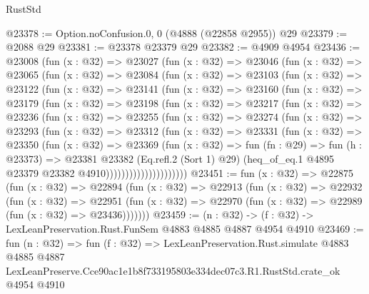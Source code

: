 \begin{lexlean}{RustStd}
\begin{coremodule}
@23378 := Option.noConfusion.{0, 0} (@4888 (@22858 @2955)) @29
@23379 := @2088 @29
@23381 := @23378 @23379 @29
@23382 := @4909 @4954
@23436 := @23008
    (fun (x : @32) =>
    @23027
      (fun (x : @32) =>
      @23046
        (fun (x : @32) =>
        @23065
          (fun (x : @32) =>
          @23084
            (fun (x : @32) =>
            @23103
              (fun (x : @32) =>
              @23122
                (fun (x : @32) =>
                @23141
                  (fun (x : @32) =>
                  @23160
                    (fun (x : @32) =>
                    @23179
                      (fun (x : @32) =>
                      @23198
                        (fun (x : @32) =>
                        @23217
                          (fun (x : @32) =>
                          @23236
                            (fun (x : @32) =>
                            @23255
                              (fun (x : @32) =>
                              @23274
                                (fun (x : @32) =>
                                @23293
                                  (fun (x : @32) =>
                                  @23312
                                    (fun (x : @32) =>
                                    @23331
                                      (fun (x : @32) =>
                                      @23350
                                        (fun (x : @32) =>
                                        @23369
                                          (fun (x : @32) =>
                                          fun (fn : @29) =>
                                          fun (h : @23373) =>
                                          @23381
                                            @23382
                                            (Eq.refl.{2} (Sort 1) @29)
                                            (heq_of_eq.{1}
                                              @4895
                                              @23379
                                              @23382
                                              @4910)))))))))))))))))))))
@23451 := fun (x : @32) =>
  @22875
    (fun (x : @32) =>
    @22894
      (fun (x : @32) =>
      @22913
        (fun (x : @32) =>
        @22932
          (fun (x : @32) =>
          @22951 (fun (x : @32) => @22970 (fun (x : @32) => @22989 (fun (x : @32) => @23436)))))))
@23459 := (n : @32) -> (f : @32) -> LexLeanPreservation.Rust.FunSem @4883 @4885 @4887 @4954 @4910
@23469 := fun (n : @32) =>
  fun (f : @32) =>
  LexLeanPreservation.Rust.simulate
    @4883
    @4885
    @4887
    LexLeanPreserve.Cce90ac1e1b8f733195803e334dec07c3.R1.RustStd.crate_ok
    @4954
    @4910
\end{coremodule}
\end{lexlean}
